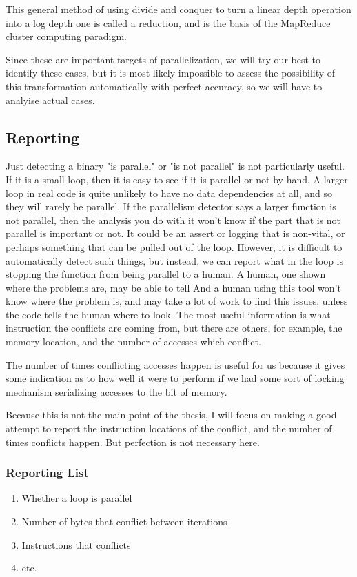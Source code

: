 \documentclass[12pt,twoside]{reedthesis}
\begin{document}
		This general method of using divide and conquer to turn a linear depth operation into a log depth one is called a reduction, and is the basis of the MapReduce cluster computing paradigm. 
		
		Since these are important targets of parallelization, we will try our best to identify these cases, but it is most likely impossible to assess the possibility of this transformation automatically with perfect accuracy, so we will have to analyise actual cases. 
		
		\subsection{Reporting}
		
		Just detecting a binary "is parallel" or "is not parallel" is not particularly useful. If it is a small loop, then it is easy to see if it is parallel or not by hand. A larger loop in real code is quite unlikely to have no data dependencies at all, and so they will rarely be parallel. If the parallelism detector says a larger function is not parallel, then the analysis you do with it won't know if the part that is not parallel is important or not. It could be an assert or logging that is non-vital, or perhaps something that can be pulled out of the loop. However, it is difficult to automatically detect such things, but instead, we can report what in the loop is stopping the function from being parallel to a human. A human, one shown where the problems are, may be able to tell  And a human using this tool won't know where the problem is, and may take a lot of work to find this issues, unless the code tells the human where to look. The most useful information is what instruction the conflicts are coming from, but there are others, for example, the memory location, and the number of accesses which conflict. 
		
		The number of times conflicting accesses happen is useful for us because it gives some indication as to how well it were to perform if we had some sort of locking mechanism serializing accesses to the bit of memory. 
		
		Because this is not the main point of the thesis, I will focus on making a good attempt to report the instruction locations of the conflict, and the number of times conflicts happen. But perfection is not necessary here.
		
		\subsubsection{Reporting List}
		\begin{enumerate}
			\item Whether a loop is parallel
			\item Number of bytes that conflict between iterations
			\item Instructions that conflicts
			\item etc.
		\end{enumerate}
		
\end{document}
